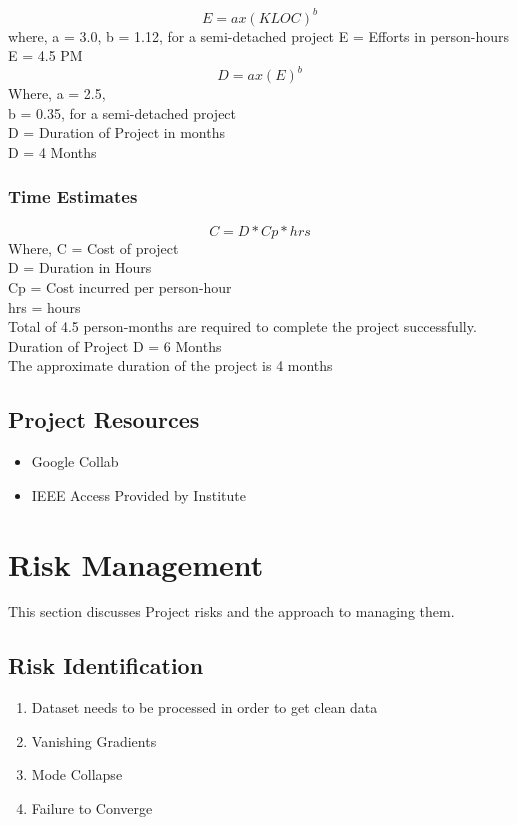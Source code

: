 \documentclass[oneside,a4paper,12pt]{report}
\begin{document}
\[E=ax(KLOC)^b\]
\hspace*{0.25 in}where, a = 3.0, b = 1.12, for a semi-detached project
E = Efforts in person-hours\\
E = 4.5 PM\\
\[D=ax(E)^b\]
Where, a = 2.5,\\
b = 0.35, for a semi-detached project\\
D = Duration of Project in months\\
D = 4 Months\\

\subsubsection{Time Estimates}
\[C=D*Cp*hrs\]
Where, C = Cost of project\\
D = Duration in Hours\\
Cp = Cost incurred per person-hour\\
hrs = hours\\
Total of 4.5 person-months are required to complete the project successfully.\\
Duration of Project D = 6 Months\\
The approximate duration of the project is 4 months\\

\subsection{Project Resources}
\begin{itemize}
  \item Google Collab
  \item IEEE Access Provided by Institute
\end{itemize}

\section{Risk Management }
This section discusses Project risks and the approach to managing them.
\subsection{Risk Identification}
\begin{enumerate}
  \item Dataset needs to be processed in order to get clean data
  \item Vanishing Gradients
  \item Mode Collapse
  \item Failure to Converge
\end{enumerate}
\end{document}
